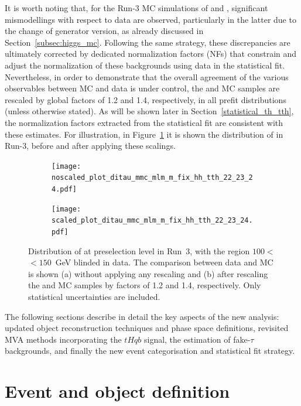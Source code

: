 It is worth noting that, for the Run-3 MC simulations of \ttbar and \ztautau, significant mismodellings with respect to data are observed, particularly in the latter due to the change of generator version, as already discussed in Section~\ref{subsec:higgs_mc}. 
Following the same strategy, these discrepancies are ultimately corrected by dedicated normalization factors (NFs) that constrain and adjust the normalization of these backgrounds using data in the statistical fit. 
Nevertheless, in order to demonstrate that the overall agreement of the various observables between MC and data is under control, the \ttbar and \ztautau MC samples are rescaled by global factors of 1.2 and 1.4, respectively, in all prefit distributions (unless otherwise stated). 
As will be shown later in Section~\ref{statistical_th_tth}, the normalization factors extracted from the statistical fit are consistent with these estimates. 
For illustration, in Figure~\ref{mmc_scaled} it is shown the distribution of \mmc in Run-3, before and after applying these scalings.

\begin{figure}[htbp]
    \centering
    \begin{subfigure}[b]{0.49\textwidth}
      \centering
      \texttt{[image: noscaled\_plot\_ditau\_mmc\_mlm\_m\_fix\_hh\_tth\_22\_23\_24.pdf]}
      \caption{}
    \end{subfigure}
    \hfill
    \begin{subfigure}[b]{0.49\textwidth}
      \centering
      \texttt{[image: scaled\_plot\_ditau\_mmc\_mlm\_m\_fix\_hh\_tth\_22\_23\_24.pdf]}
      \caption{}
    \end{subfigure}
    \caption{
      Distribution of \mmc at preselection level in Run~3, with the region $100<$\mmc$<150$~GeV blinded in data. 
      The comparison between data and MC is shown (a) without applying any rescaling and (b) after rescaling the \ttbar and \ztautau MC samples by factors of 1.2 and 1.4, respectively. Only statistical uncertainties are included.
    }
    \label{mmc_scaled}
  \end{figure}
  
The following sections describe in detail the key aspects of the new analysis: updated object reconstruction techniques and phase space definitions, revisited MVA methods incorporating the $tHqb$ signal, the estimation of fake-$\tau$ backgrounds, and finally the new event categorisation and statistical fit strategy.


\section{Event and object definition}


